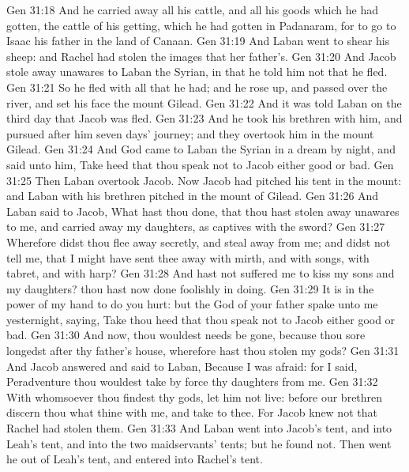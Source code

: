 \vs Gen 31:18 And he carried away all his cattle, and all his goods which he had gotten, the cattle of his getting, which he had gotten in Padanaram, for to go to Isaac his father in the land of Canaan.
\vs Gen 31:19 And Laban went to shear his sheep: and Rachel had stolen the images that  her father's.
\vs Gen 31:20 And Jacob stole away unawares to Laban the Syrian, in that he told him not that he fled.
\vs Gen 31:21 So he fled with all that he had; and he rose up, and passed over the river, and set his face  the mount Gilead.
\vs Gen 31:22 And it was told Laban on the third day that Jacob was fled.
\vs Gen 31:23 And he took his brethren with him, and pursued after him seven days' journey; and they overtook him in the mount Gilead.
\vs Gen 31:24 And God came to Laban the Syrian in a dream by night, and said unto him, Take heed that thou speak not to Jacob either good or bad.
\vs Gen 31:25 Then Laban overtook Jacob. Now Jacob had pitched his tent in the mount: and Laban with his brethren pitched in the mount of Gilead.
\vs Gen 31:26 And Laban said to Jacob, What hast thou done, that thou hast stolen away unawares to me, and carried away my daughters, as captives  with the sword?
\vs Gen 31:27 Wherefore didst thou flee away secretly, and steal away from me; and didst not tell me, that I might have sent thee away with mirth, and with songs, with tabret, and with harp?
\vs Gen 31:28 And hast not suffered me to kiss my sons and my daughters? thou hast now done foolishly in  doing.
\vs Gen 31:29 It is in the power of my hand to do you hurt: but the God of your father spake unto me yesternight, saying, Take thou heed that thou speak not to Jacob either good or bad.
\vs Gen 31:30 And now,  thou wouldest needs be gone, because thou sore longedst after thy father's house,  wherefore hast thou stolen my gods?
\vs Gen 31:31 And Jacob answered and said to Laban, Because I was afraid: for I said, Peradventure thou wouldest take by force thy daughters from me.
\vs Gen 31:32 With whomsoever thou findest thy gods, let him not live: before our brethren discern thou what  thine with me, and take  to thee. For Jacob knew not that Rachel had stolen them.
\vs Gen 31:33 And Laban went into Jacob's tent, and into Leah's tent, and into the two maidservants' tents; but he found  not. Then went he out of Leah's tent, and entered into Rachel's tent.
